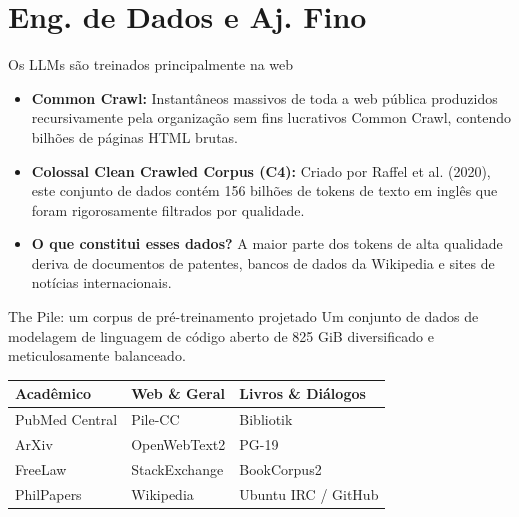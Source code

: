 \documentclass[aspectratio=169]{beamer}
\begin{document}
\section{Eng. de Dados e Aj. Fino}

\begin{frame}{Os LLMs são treinados principalmente na web}\justifying
    \begin{itemize}
        \item \textbf{Common Crawl:} Instantâneos massivos de toda a web pública produzidos recursivamente pela organização sem fins lucrativos Common Crawl, contendo bilhões de páginas HTML brutas.
        \item \textbf{Colossal Clean Crawled Corpus (C4):} Criado por Raffel et al. (2020), este conjunto de dados contém 156 bilhões de tokens de texto em inglês que foram rigorosamente filtrados por qualidade.
        \item \textbf{O que constitui esses dados?} A maior parte dos tokens de alta qualidade deriva de documentos de patentes, bancos de dados da Wikipedia e sites de notícias internacionais.
    \end{itemize}
\end{frame}

\begin{frame}{The Pile: um corpus de pré-treinamento projetado}\justifying
    Um conjunto de dados de modelagem de linguagem de código aberto de 825 GiB diversificado e meticulosamente balanceado.
    \vspace{0.5cm}
    \begin{table}
        \centering
        \begin{tabular}{lll}
            \toprule
            \textbf{Acadêmico} & \textbf{Web \& Geral} & \textbf{Livros \& Diálogos} \\
            \midrule
            PubMed Central & Pile-CC & Bibliotik \\
            ArXiv & OpenWebText2 & PG-19 \\
            FreeLaw & StackExchange & BookCorpus2 \\
            PhilPapers & Wikipedia & Ubuntu IRC / GitHub \\
            \bottomrule
        \end{tabular}
    \end{table}
\end{frame}
\end{document}
